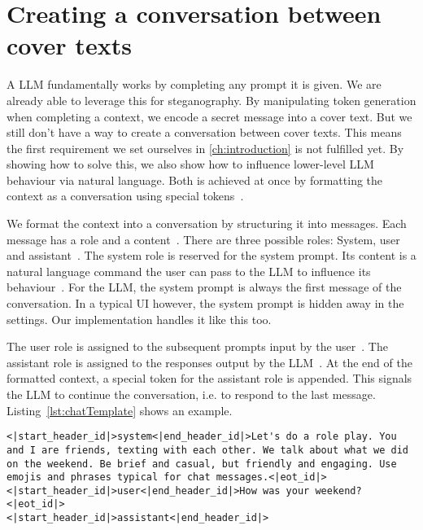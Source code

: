 \section{Creating a conversation between cover texts}
\label{sec:creatingAConversationBetweenCoverTexts}
A \gls{LLM} fundamentally works by completing any prompt it is given. We are already able to leverage this for steganography. By manipulating token generation when completing a context, we encode a secret message into a cover text. But we still don't have a way to create a conversation between cover texts. This means the first requirement we set ourselves in \cref{ch:introduction} is not fulfilled yet. By showing how to solve this, we also show how to influence lower-level \gls{LLM} behaviour via natural language. Both is achieved at once by formatting the context as a conversation using special tokens~\cite{jiangChatBugCommonVulnerability2025}.

We format the context into a conversation by structuring it into messages. Each message has a role and a content~\cite{jiangChatBugCommonVulnerability2025}. There are three possible roles: System, user and assistant~\cite{jiangChatBugCommonVulnerability2025}. The system role is reserved for the system prompt. Its content is a natural language command the user can pass to the \gls{LLM} to influence its behaviour~\cite{jiangChatBugCommonVulnerability2025}. For the \gls{LLM}, the system prompt is always the first message of the conversation. In a typical \gls{UI} however, the system prompt is hidden away in the settings. Our implementation handles it like this too.

The user role is assigned to the subsequent prompts input by the user~\cite{jiangChatBugCommonVulnerability2025}. The assistant role is assigned to the responses output by the \gls{LLM}~\cite{jiangChatBugCommonVulnerability2025}. At the end of the formatted context, a special token for the assistant role is appended. This signals the \gls{LLM} to continue the conversation, i.e. to respond to the last message. Listing~\ref{lst:chatTemplate} shows an example.

\vspace{0.25cm}

\begin{lstlisting}[caption={[llama.cpp: Chat templates]{Example for a context formatted with the chat template of Llama 3.2 1B. Some line breaks have been added for readability.}}, label={lst:chatTemplate}]
<|start_header_id|>system<|end_header_id|>Let's do a role play. You and I are friends, texting with each other. We talk about what we did on the weekend. Be brief and casual, but friendly and engaging. Use emojis and phrases typical for chat messages.<|eot_id|>
<|start_header_id|>user<|end_header_id|>How was your weekend?<|eot_id|>
<|start_header_id|>assistant<|end_header_id|>
\end{lstlisting}

